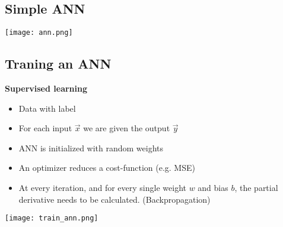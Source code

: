 \subsection{Simple ANN}
\texttt{[image: ann.png]}

\subsection{Traning an ANN}
\textbf{Supervised learning}
\begin{itemize}
    \item Data with label
    \item For each input $\vec{x}$ we are given the output $\vec{y}$
    \item ANN is initialized with random weights
    \item An optimizer reduces a cost-function (e.g. MSE)
    \item At every iteration, and for every single weight $w$ and bias $b$, the partial derivative needs to be calculated. (Backpropagation)
\end{itemize}
\texttt{[image: train\_ann.png]}
